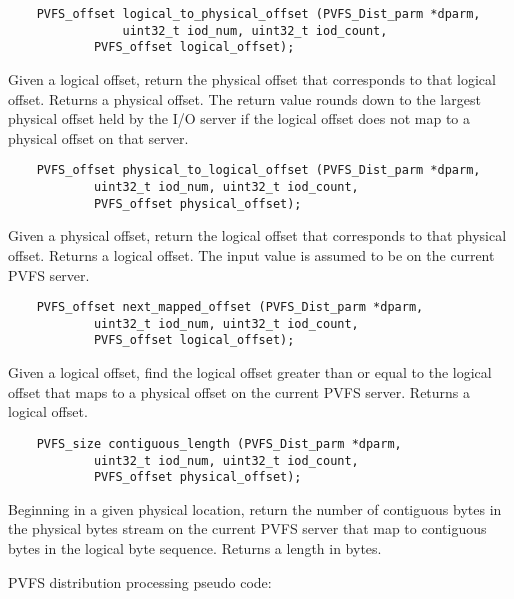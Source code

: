 \documentclass[11pt]{article}
\begin{document}
\begin{verbatim}
   	PVFS_offset logical_to_physical_offset (PVFS_Dist_parm *dparm,
        		uint32_t iod_num, uint32_t iod_count,
         	PVFS_offset logical_offset);
\end{verbatim}

Given a logical offset, return the physical offset that corresponds to
that logical offset.  Returns a physical offset.  The return value rounds 
down to the largest physical offset held by the I/O server if the 
logical offset does not map to a physical offset on that server.

\begin{verbatim}
   	PVFS_offset physical_to_logical_offset (PVFS_Dist_parm *dparm,
         	uint32_t iod_num, uint32_t iod_count,
         	PVFS_offset physical_offset);
\end{verbatim}

Given a physical offset, return the logical offset that corresponds to
that physical offset.  Returns a logical offset.  The input value is
assumed to be on the current PVFS server.

\begin{verbatim}
   	PVFS_offset next_mapped_offset (PVFS_Dist_parm *dparm,
         	uint32_t iod_num, uint32_t iod_count,
         	PVFS_offset logical_offset);
\end{verbatim}

Given a logical offset, find the logical offset greater than or equal
to the logical offset that maps to a physical offset on the current
PVFS server.  Returns a logical offset.

\begin{verbatim}
   	PVFS_size contiguous_length (PVFS_Dist_parm *dparm,
         	uint32_t iod_num, uint32_t iod_count,
         	PVFS_offset physical_offset);
\end{verbatim}

Beginning in a given physical location, return the number of contiguous
bytes in the physical bytes stream on the current PVFS server that map
to contiguous bytes in the logical byte sequence.  Returns a length in bytes.

PVFS distribution processing pseudo code:
\end{document}
